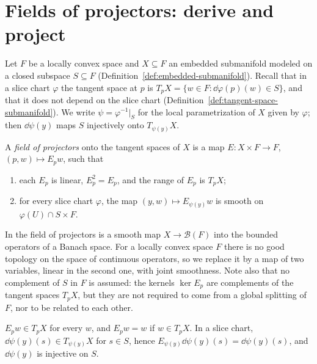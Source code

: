\section{Fields of projectors: derive and project}
\label{sec:conn-projectors}

Let $F$ be a locally convex space and $X \subseteq F$ an embedded submanifold modeled on a closed
subspace $S \subseteq F$ (Definition~\ref{def:embedded-submanifold}). Recall that in a slice chart
$\varphi$ the tangent space at $p$ is $T_p X = \{w \in F : \dd\varphi(p)(w) \in S\}$, and that it
does not depend on the slice chart (Definition~\ref{def:tangent-space-submanifold}). We write
$\psi = \varphi^{-1}|_S$ for the local parametrization of $X$ given by $\varphi$; then
$\dd\psi(y)$ maps $S$ injectively onto $T_{\psi(y)} X$.

\begin{definition}
  \label{def:projector-field}
  \leanok
  A \emph{field of projectors} onto the tangent spaces of $X$ is a map
  $E \colon X \times F \to F$, $(p, w) \mapsto E_p w$, such that
  \begin{enumerate}
    \item each $E_p$ is linear, $E_p^2 = E_p$, and the range of $E_p$ is $T_p X$;
    \item for every slice chart $\varphi$, the map $(y, w) \mapsto E_{\psi(y)} w$ is smooth on
    $\varphi(U) \cap S \times F$.
  \end{enumerate}
\end{definition}

\begin{remark}
  In \cite{Lar22} the field of projectors is a smooth map $X \to \mathcal B(F)$ into the bounded
  operators of a Banach space. For a locally convex space $F$ there is no good topology on the
  space of continuous operators, so we replace it by a map of two variables, linear in the second
  one, with joint smoothness. Note also that no complement of $S$ in $F$ is assumed: the kernels
  $\ker E_p$ are complements of the tangent spaces $T_p X$, but they are not required to come from
  a global splitting of $F$, nor to be related to each other.
\end{remark}

\begin{lemma}
  \label{lem:projector-tangent}
  \leanok
  $E_p w \in T_p X$ for every $w$, and $E_p w = w$ if $w \in T_p X$. In a slice chart,
  $\dd\psi(y)(s) \in T_{\psi(y)} X$ for $s \in S$, hence $E_{\psi(y)}\dd\psi(y)(s) = \dd\psi(y)(s)$,
  and $\dd\psi(y)$ is injective on $S$.
\end{lemma}

